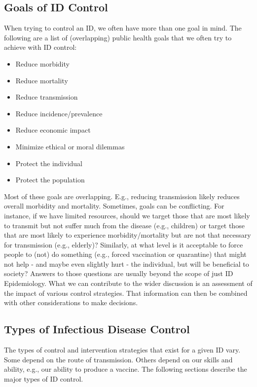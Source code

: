 \documentclass[]{article}
\providecommand{\tightlist}{%
  \setlength{\itemsep}{0pt}\setlength{\parskip}{0pt}}
\theoremstyle{definition}
\theoremstyle{definition}
\theoremstyle{definition}
\theoremstyle{remark}
\begin{document}
\subsection{Goals of ID Control}\label{goals-of-id-control}

When trying to control an ID, we often have more than one goal in mind.
The following are a list of (overlapping) public health goals that we
often try to achieve with ID control:

\begin{itemize}
\tightlist
\item
  Reduce morbidity
\item
  Reduce mortality
\item
  Reduce transmission
\item
  Reduce incidence/prevalence
\item
  Reduce economic impact
\item
  Minimize ethical or moral dilemmas
\item
  Protect the individual
\item
  Protect the population
\end{itemize}

Most of these goals are overlapping. E.g., reducing transmission likely
reduces overall morbidity and mortality. Sometimes, goals can be
conflicting. For instance, if we have limited resources, should we
target those that are most likely to transmit but not suffer much from
the disease (e.g., children) or target those that are most likely to
experience morbidity/mortality but are not that necessary for
transmission (e.g., elderly)? Similarly, at what level is it acceptable
to force people to (not) do something (e.g., forced vaccination or
quarantine) that might not help - and maybe even slightly hurt - the
individual, but will be beneficial to society? Answers to those
questions are usually beyond the scope of just ID Epidemiology. What we
can contribute to the wider discussion is an assessment of the impact of
various control strategies. That information can then be combined with
other considerations to make decisions.

\subsection{Types of Infectious Disease
Control}\label{types-of-infectious-disease-control}

The types of control and intervention strategies that exist for a given
ID vary. Some depend on the route of transmission. Others depend on our
skills and ability, e.g., our ability to produce a vaccine. The
following sections describe the major types of ID control.
\end{document}
